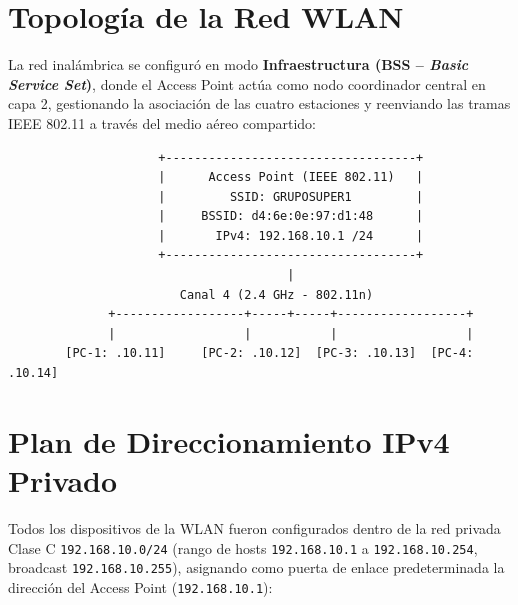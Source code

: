 \documentclass[11pt, a4paper]{article}
\begin{document}
\section{Topología de la Red WLAN}

La red inalámbrica se configuró en modo \textbf{Infraestructura (BSS -- \textit{Basic Service Set})}, donde el Access Point actúa como nodo coordinador central en capa 2, gestionando la asociación de las cuatro estaciones y reenviando las tramas IEEE 802.11 a través del medio aéreo compartido:

\begin{verbatim}
                     +-----------------------------------+
                     |      Access Point (IEEE 802.11)   |
                     |         SSID: GRUPOSUPER1         |
                     |     BSSID: d4:6e:0e:97:d1:48      |
                     |       IPv4: 192.168.10.1 /24      |
                     +-----------------------------------+
                                       |
                        Canal 4 (2.4 GHz - 802.11n)
              +------------------+-----+-----+------------------+
              |                  |           |                  |
        [PC-1: .10.11]     [PC-2: .10.12]  [PC-3: .10.13]  [PC-4: .10.14]
\end{verbatim}

\section{Plan de Direccionamiento IPv4 Privado}

Todos los dispositivos de la WLAN fueron configurados dentro de la red privada Clase C \texttt{192.168.10.0/24} (rango de hosts \texttt{192.168.10.1} a \texttt{192.168.10.254}, broadcast \texttt{192.168.10.255}), asignando como puerta de enlace predeterminada la dirección del Access Point (\texttt{192.168.10.1}):
\end{document}
